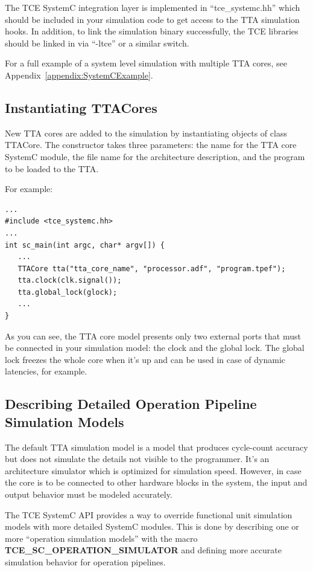 \documentclass[twoside]{tceusermanual}
\begin{document}
The TCE SystemC integration layer is implemented in ``tce\_systemc.hh'' which 
should be included in your simulation code to get access to the TTA
simulation hooks. In addition, to link the simulation binary successfully,
the TCE libraries should be linked in via ``-ltce'' or a similar switch. 

For a full example of a system level simulation with multiple TTA cores, 
see Appendix~\ref{appendix:SystemCExample}.

\subsection{Instantiating TTACores}

New TTA cores are added to the simulation by instantiating objects of
class TTACore. The constructor takes three parameters: the name for
the TTA core SystemC module, the file name for the architecture description,
and the program to be loaded to the TTA.

For example:

\begin{verbatim}
...
#include <tce_systemc.hh>
...
int sc_main(int argc, char* argv[]) {
   ...
   TTACore tta("tta_core_name", "processor.adf", "program.tpef");
   tta.clock(clk.signal());
   tta.global_lock(glock);
   ...
}
\end{verbatim}

As you can see, the TTA core model presents only two external ports that
must be connected in your simulation model: the clock and the
global lock. The global lock freezes the whole core when
it's up and can be used in case of dynamic latencies, for example.
 
\subsection{Describing Detailed Operation Pipeline Simulation Models}

The default TTA simulation model is a model that produces cycle-count
accuracy but does not simulate the details not visible to the programmer.
It's an architecture simulator which is optimized for simulation speed. 
However, in case the core is to be connected to other hardware blocks in the
system, the input and output behavior must be modeled accurately. 

The TCE SystemC API provides a way to override functional unit simulation
models with more detailed SystemC modules. This is done by describing
one or more ``operation simulation models'' with the macro
\textbf{TCE\_SC\_OPERATION\_SIMULATOR} and defining more accurate
simulation behavior for operation pipelines.
\end{document}
